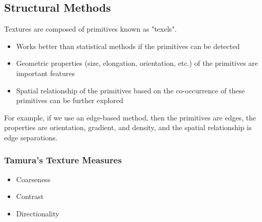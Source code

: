 \documentclass{article}
\begin{document}
\begin{multicols}{2}
\subsection{Structural Methods}

Textures are composed of primitives known as "texels".

\begin{itemize}
  \item {Works better than statistical methods if the primitives can be detected}
  \item {Geometric properties (size, elongation, orientation, etc.) of the primitives are important features}
  \item {Spatial relationship of the primitives based on the co-occurrence of these primitives can be further explored}
\end{itemize}

For example, if we use an edge-based method, then the primitives are edges, the properties are orientation, gradient, and density, and the spatial relationship is edge separations.

\subsubsection{Tamura's Texture Measures}

\begin{itemize}
  \item {Coarseness}
  \item {Contrast}
  \item {Directionality}
\end{itemize}




\end{multicols}
\end{document}
